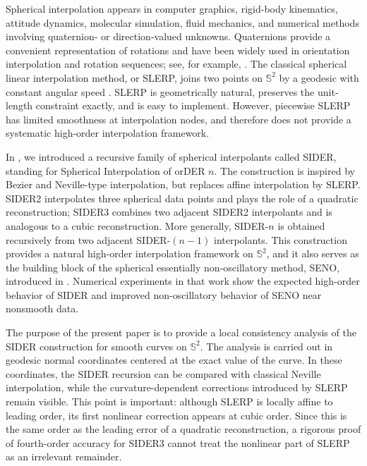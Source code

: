 \documentclass[a4paper,11pt]{article}
\newcommand{\bS}{\mathbb{S}}
\numberwithin{equation}{section}
\begin{document}
Spherical interpolation appears in computer graphics, rigid-body kinematics,
attitude dynamics, molecular simulation, fluid mechanics, and numerical methods
involving quaternion- or direction-valued unknowns.  Quaternions provide a
convenient representation of rotations and have been widely used in orientation
interpolation and rotation sequences; see, for example,
\cite{ham63,kui02,muk02,zha97}.  The classical spherical linear interpolation
method, or SLERP, joins two points on \(\bS^2\) by a geodesic with constant
angular speed \cite{sho85}.  SLERP is geometrically natural, preserves the
unit-length constraint exactly, and is easy to implement.  However, piecewise
SLERP has limited smoothness at interpolation nodes, and therefore does not
provide a systematic high-order interpolation framework.

In \cite{fonleu23}, we introduced a recursive family of spherical
interpolants called SIDER, standing for Spherical Interpolation of orDER
\(n\).  The construction is inspired by Bezier and Neville-type interpolation,
but replaces affine interpolation by SLERP.  SIDER2 interpolates three
spherical data points and plays the role of a quadratic reconstruction; SIDER3
combines two adjacent SIDER2 interpolants and is analogous to a cubic
reconstruction.  More generally, SIDER-\(n\) is obtained recursively from two
adjacent SIDER-\((n-1)\) interpolants.  This construction provides a natural
high-order interpolation framework on \(\bS^2\), and it also serves as the
building block of the spherical essentially non-oscillatory method, SENO,
introduced in \cite{fonleu23}.  Numerical experiments in that work show
the expected high-order behavior of SIDER and improved non-oscillatory
behavior of SENO near nonsmooth data.

The purpose of the present paper is to provide a local consistency analysis of
the SIDER construction for smooth curves on \(\bS^2\).  The analysis is
carried out in geodesic normal coordinates centered at the exact value of the
curve.  In these coordinates, the SIDER recursion can be compared with
classical Neville interpolation, while the curvature-dependent corrections
introduced by SLERP remain visible.  This point is important: although SLERP is
locally affine to leading order, its first nonlinear correction appears at
cubic order.  Since this is the same order as the leading error of a quadratic
reconstruction, a rigorous proof of fourth-order accuracy for SIDER3 cannot
treat the nonlinear part of SLERP as an irrelevant remainder.
\end{document}
